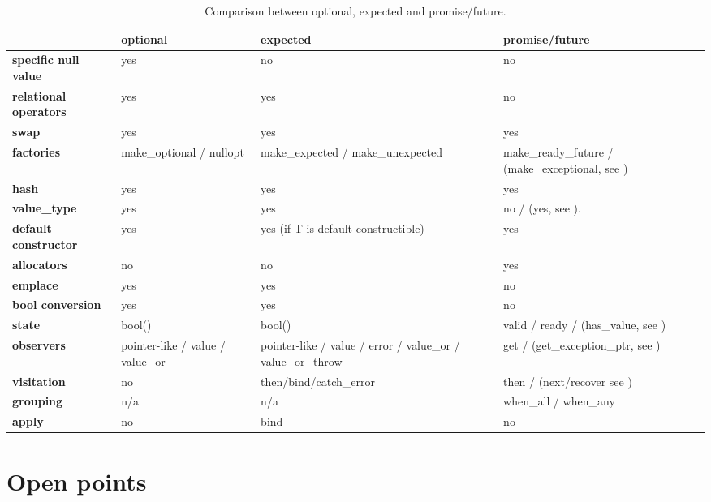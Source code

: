 \documentclass[a4paper,10pt]{article}
\begin{document}
\begin{table}
\bgroup
\def\arraystretch{1.5}
\begin{tabular}{|l|>{\raggedright\arraybackslash}p{4cm}|>{\raggedright\arraybackslash}p{4cm}|>{\raggedright\arraybackslash}p{4cm}|}
\hline
                    & \textbf{optional} & \textbf{expected} & \textbf{promise/future} \\
\hline
\textbf{specific null value} & yes & no & no \\
\hline
\textbf{relational operators} & yes & yes & no \\
\hline
\textbf{swap} & yes & yes & yes \\
\hline
\textbf{factories} & make_optional / nullopt & make_expected / make_unexpected & make_ready_future / (make_exceptional, see \cite{MoreAsync}) \\
\hline
\textbf{hash} & yes & yes & yes \\
\hline
\textbf{value_type} & yes & yes & no / (yes, see \cite{MoreAsync}).  \\
\hline
\textbf{default constructor} & yes & yes (if T is default constructible) & yes \\
\hline
\textbf{allocators} & no & no & yes \\
\hline
\textbf{emplace} & yes & yes & no \\
\hline
\textbf{bool conversion} & yes & yes & no \\
\hline
\textbf{state} & bool()  &  bool() & valid / ready / (has_value, see \cite{MoreAsync}) \\
\hline
\textbf{observers} & pointer-like / value / value_or & pointer-like / value / error / value_or / value_or_throw & get / (get_exception_ptr, see \cite{MoreAsync}) \\
\hline
\textbf{visitation} & no & then/bind/catch_error  & then / (next/recover see \cite{MoreAsync}) \\
\hline
\textbf{grouping} & n/a & n/a & when_all / when_any \\
\hline
\textbf{apply} & no & bind & no \\
\hline
\end{tabular}
\egroup
\caption{Comparison between optional, expected and promise/future.}
\label{comp-monads}
\end{table}

\section{Open points}
\end{document}
